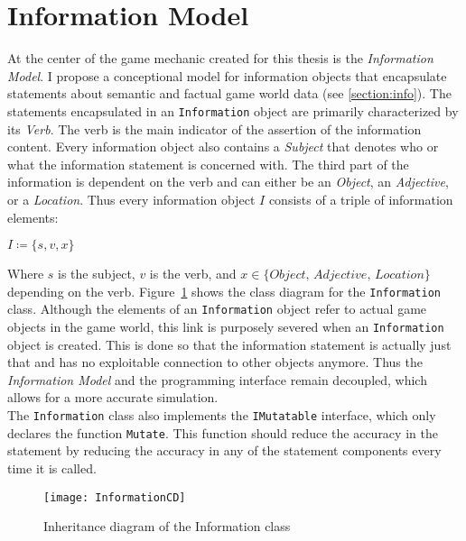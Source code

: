 \section{Information Model}
At the center of the game mechanic created for this thesis is the \textit{Information Model}. I propose a conceptional model for information objects that encapsulate statements about semantic and factual game world data (see \ref{section:info}). The statements encapsulated in an \verb|Information| object are primarily characterized by its \textit{Verb}. The verb is the main indicator of the assertion of the information content. Every information object also contains a \textit{Subject} that denotes who or what the information statement is concerned with. The third part of the information is dependent on the verb and can either be an \textit{Object}, an \textit{Adjective}, or a \textit{Location}.
Thus every information object $I$ consists of a triple of information elements:
\begin{center}
	$I \coloneqq \{s, v, x\}$ 
\end{center}
Where $s$ is the subject, $v$ is the verb, and $x \in \{\textit{Object, Adjective, Location}\}$ depending on the verb. Figure~\ref{fig:informationCD} shows the class diagram for the \verb|Information| class. Although the elements of an \verb|Information| object refer to actual game objects in the game world, this link is purposely severed when an \verb|Information| object is created. This is done so that the information statement is actually just that and has no exploitable connection to other objects anymore. Thus the \textit{Information Model} and the programming interface remain decoupled, which allows for a more accurate simulation.\\
The \verb|Information| class also implements the \verb|IMutatable| interface, which only declares the function \verb|Mutate|. This function should reduce the accuracy in the statement by reducing the accuracy in any of the statement components every time it is called.
\begin{figure}
	\centering
	\texttt{[image: InformationCD]}
	\caption{Inheritance diagram of the Information class}
	\label{fig:informationCD}
\end{figure}
